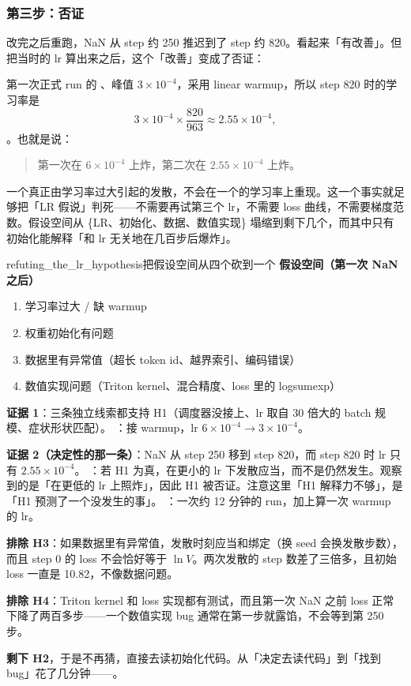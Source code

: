 \subsubsection*{第三步：否证}

改完之后重跑，NaN 从 step 约 250 推迟到了 step 约 820。看起来「有改善」。但把当时的 lr 算出来之后，这个「改善」变成了否证：

第一次正式 run 的 、峰值 $3\times10^{-4}$，采用 linear warmup，所以 step 820 时的学习率是
\[
3\times10^{-4}\times\frac{820}{963} \approx 2.55\times10^{-4},
\]
。也就是说：

\begin{quote}
第一次在 $6\times10^{-4}$ 上炸，第二次在 $2.55\times10^{-4}$ 上炸。
\end{quote}

一个真正由学习率过大引起的发散，不会在一个的学习率上重现。这一个事实就足够把「LR 假说」判死——不需要再试第三个 lr，不需要 loss 曲线，不需要梯度范数。假设空间从 \{LR、初始化、数据、数值实现\} 塌缩到剩下几个，而其中只有初始化能解释「和 lr 无关地在几百步后爆炸」。

\begin{examplebox}{refuting_the_lr_hypothesis}{把假设空间从四个砍到一个}
\noindent\textbf{假设空间（第一次 NaN 之后）}
\begin{enumerate}[label=H\arabic*., leftmargin=3em]\itemsep2pt
  \item 学习率过大 / 缺 warmup
  \item 权重初始化有问题
  \item 数据里有异常值（超长 token id、越界索引、编码错误）
  \item 数值实现问题（Triton kernel、混合精度、loss 里的 logsumexp）
\end{enumerate}

\medskip\noindent\textbf{证据 1}：三条独立线索都支持 H1（调度器没接上、lr 取自 30 倍大的 batch 规模、症状形状匹配）。
：接 warmup，lr $6\times10^{-4}\to3\times10^{-4}$。

\medskip\noindent\textbf{证据 2（决定性的那一条）}：NaN 从 step 250 移到 step 820，而 step 820 时 lr 只有 $2.55\times10^{-4}$。
：若 H1 为真，在更小的 lr 下发散应当，而不是仍然发生。观察到的是「在更低的 lr 上照炸」，因此 H1 被否证。注意这里「H1 解释力不够」，是「H1 预测了一个没发生的事」。
：一次约 12 分钟的 run，加上算一次 warmup 的 lr。

\medskip\noindent\textbf{排除 H3}：如果数据里有异常值，发散时刻应当和绑定（换 seed 会换发散步数），而且 step 0 的 loss 不会恰好等于 $\ln V$。两次发散的 step 数差了三倍多，且初始 loss 一直是 10.82，不像数据问题。

\medskip\noindent\textbf{排除 H4}：Triton kernel 和 loss 实现都有测试，而且第一次 NaN 之前 loss 正常下降了两百多步——一个数值实现 bug 通常在第一步就露馅，不会等到第 250 步。

\medskip\noindent\textbf{剩下 H2}，于是不再猜，直接去读初始化代码。从「决定去读代码」到「找到 bug」花了几分钟——。
\end{examplebox}

